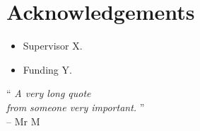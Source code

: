 \chapter*{Acknowledgements}
\makeatletter{}\makeatother

\begin{itemize}
	\item Supervisor X.
	\item Funding Y.
\end{itemize}
\begin{centering}
{\LARGE``} \textit{A very long quote}\\
\textit{from someone very important.} {\LARGE''}\\
-- Mr M\\
\end{centering}